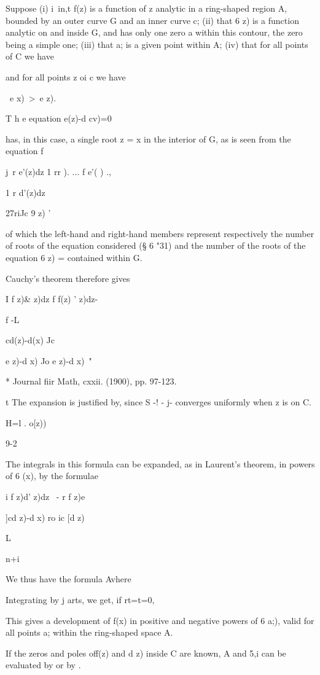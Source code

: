 Suppose (i) i\ in,t f(z) is a function of z analytic in a ring-shaped
region A, bounded by an outer curve G and an inner curve c; (ii) that
6 z) is a function analytic on and inside G, and has only one zero a
within this contour, the zero being a simple one; (iii) that a; is a
given point within A; (iv) that for all points of C we have

and for all points z oi c we have

\ e x)\ >\ e z).

T h e equation e(z)-d cv)=0

has, in this case, a single root z = x in the interior of G, as is
seen from the equation f

j\ r e'(z)dz 1 rr ). ... f e'( ) .,

1 r d'(z)dz

27riJc 9 z) '

of which the left-hand and right-hand members represent respectively
the number of roots of the equation considered (§ 6 "31) and the
number of the roots of the equation 6 z) = contained within G.

Cauchy's theorem therefore gives

I f z)\& z)dz f f(z) ' z)dz-

f -L

 cd(z)-d(x) Jc

e z)-d x) Jo e z)-d x)\ "

* Journal fiir Math, cxxii. (1900), pp. 97-123.

t The expansion is justified by, since S -! - j- converges
uniformly when z is on C.

H=l . o[z))

9-2

% 
%
The integrals in this formula can be expanded, as in Laurent's
theorem, in powers of 6 (x), by the formulae

i f z)d' z)dz \ - r f z)e

]cd z)-d x) ro ic [d z)\

L

n+i

We thus have the formula Avhere

Integrating by j arts, we get, if rt=t=0,

This gives a development of f(x) in positive and negative powers of 6
a;), valid for all points a; within the ring-shaped space A.

If the zeros and poles off(z) and d z) inside C are known, A and 5,i
can be evaluated by or by .

